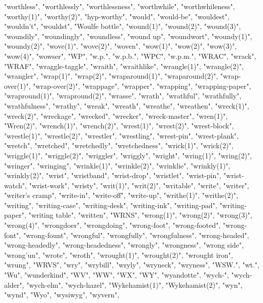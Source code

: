 "worthless",
"worthlessly",
"worthlessness",
"worthwhile",
"worthwhileness",
"worthy(1)",
"worthy(2)",
"hyp-worthy",
"would",
"would-be",
"wouldest",
"wouldn't",
"wouldst",
"Woulfe bottle",
"wound(1)",
"wound(2)",
"wound(3)",
"woundily",
"woundingly",
"woundless",
"wound up",
"woundwort",
"woundy(1)",
"woundy(2)",
"wove(1)",
"wove(2)",
"woven",
"wow(1)",
"wow(2)",
"wow(3)",
"wow(4)",
"wowser",
"WP",
"w.p.",
"w.p.b.",
"WPC",
"w.p.m.",
"WRAC",
"wrack",
"WRAF",
"wraggle-taggle",
"wraith",
"wraithlike",
"wrangle(1)",
"wrangle(2)",
"wrangler",
"wrap(1)",
"wrap(2)",
"wraparound(1)",
"wraparound(2)",
"wrap-over(1)",
"wrap-over(2)",
"wrappage",
"wrapper",
"wrapping",
"wrapping-paper",
"wrapround(1)",
"wrapround(2)",
"wrasse",
"wrath",
"wrathful",
"wrathfully",
"wrathfulness",
"wrathy",
"wreak",
"wreath",
"wreathe",
"wreathen",
"wreck(1)",
"wreck(2)",
"wreckage",
"wrecked",
"wrecker",
"wreck-master",
"wren(1)",
"Wren(2)",
"wrench(1)",
"wrench(2)",
"wrest(1)",
"wrest(2)",
"wrest-block",
"wrestle(1)",
"wrestle(2)",
"wrestler",
"wrestling",
"wrest-pin",
"wrest-plank",
"wretch",
"wretched",
"wretchedly",
"wretchedness",
"wrick(1)",
"wrick(2)",
"wriggle(1)",
"wriggle(2)",
"wriggler",
"wriggly",
"wright",
"wring(1)",
"wring(2)",
"wringer",
"wringing",
"wrinkle(1)",
"wrinkle(2)",
"wrinklie",
"wrinkly(1)",
"wrinkly(2)",
"wrist",
"wristband",
"wrist-drop",
"wristlet",
"wrist-pin",
"wrist-watch",
"wrist-work",
"wristy",
"writ(1)",
"writ(2)",
"writable",
"write",
"writer",
"writer's cramp",
"write-in",
"write-off",
"write-up",
"writhe(1)",
"writhe(2)",
"writing",
"writing-case",
"writing-desk",
"writing-ink",
"writing-pad",
"writing-paper",
"writing table",
"written",
"WRNS",
"wrong(1)",
"wrong(2)",
"wrong(3)",
"wrong(4)",
"wrongdoer",
"wrongdoing",
"wrong-foot",
"wrong-footed",
"wrong-font",
"wrong-fount",
"wrongful",
"wrongfully",
"wrongfulness",
"wrong-headed",
"wrong-headedly",
"wrong-headedness",
"wrongly",
"wrongness",
"wrong side",
"wrong'un",
"wrote",
"wroth",
"wrought(1)",
"wrought(2)",
"wrought iron",
"wrung",
"WRVS",
"wry",
"wrybill",
"wryly",
"wryneck",
"wryness",
"WSW.",
"wt.",
"Wu",
"wunderkind",
"WV",
"WW",
"WX",
"WY",
"wyandotte",
"wych-",
"wych-alder",
"wych-elm",
"wych-hazel",
"Wykehamist(1)",
"Wykehamist(2)",
"wyn",
"wynd",
"Wyo",
"wysiwyg",
"wyvern",

